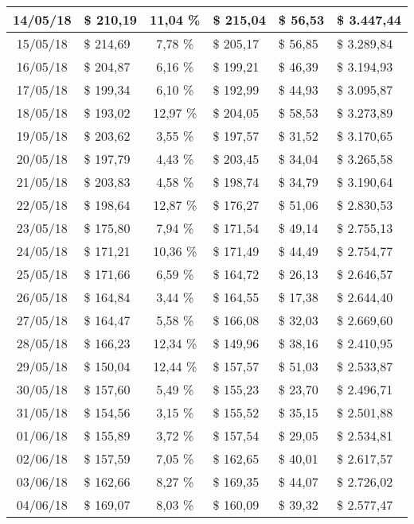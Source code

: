 \begin{center}
\begin{small}
\begin{longtable}{|c|l|c|l|l|l|}
14/05/18 & \$ 210,19 & 11,04 \% & \$ 215,04 & \$ 56,53 & \$ 3.447,44 \\ \hline
15/05/18 & \$ 214,69 & 7,78 \% & \$ 205,17 & \$ 56,85 & \$ 3.289,84 \\ \hline
16/05/18 & \$ 204,87 & 6,16 \% & \$ 199,21 & \$ 46,39 & \$ 3.194,93 \\ \hline
17/05/18 & \$ 199,34 & 6,10 \% & \$ 192,99 & \$ 44,93 & \$ 3.095,87 \\ \hline
18/05/18 & \$ 193,02 & 12,97 \% & \$ 204,05 & \$ 58,53 & \$ 3.273,89 \\ \hline
19/05/18 & \$ 203,62 & 3,55 \% & \$ 197,57 & \$ 31,52 & \$ 3.170,65 \\ \hline
20/05/18 & \$ 197,79 & 4,43 \% & \$ 203,45 & \$ 34,04 & \$ 3.265,58 \\ \hline
21/05/18 & \$ 203,83 & 4,58 \% & \$ 198,74 & \$ 34,79 & \$ 3.190,64 \\ \hline
22/05/18 & \$ 198,64 & 12,87 \% & \$ 176,27 & \$ 51,06 & \$ 2.830,53 \\ \hline
23/05/18 & \$ 175,80 & 7,94 \% & \$ 171,54 & \$ 49,14 & \$ 2.755,13 \\ \hline
24/05/18 & \$ 171,21 & 10,36 \% & \$ 171,49 & \$ 44,49 & \$ 2.754,77 \\ \hline
25/05/18 & \$ 171,66 & 6,59 \% & \$ 164,72 & \$ 26,13 & \$ 2.646,57 \\ \hline
26/05/18 & \$ 164,84 & 3,44 \% & \$ 164,55 & \$ 17,38 & \$ 2.644,40 \\ \hline
27/05/18 & \$ 164,47 & 5,58 \% & \$ 166,08 & \$ 32,03 & \$ 2.669,60 \\ \hline
28/05/18 & \$ 166,23 & 12,34 \% & \$ 149,96 & \$ 38,16 & \$ 2.410,95 \\ \hline
29/05/18 & \$ 150,04 & 12,44 \% & \$ 157,57 & \$ 51,03 & \$ 2.533,87 \\ \hline
30/05/18 & \$ 157,60 & 5,49 \% & \$ 155,23 & \$ 23,70 & \$ 2.496,71 \\ \hline
31/05/18 & \$ 154,56 & 3,15 \% & \$ 155,52 & \$ 35,15 & \$ 2.501,88 \\ \hline
01/06/18 & \$ 155,89 & 3,72 \% & \$ 157,54 & \$ 29,05 & \$ 2.534,81 \\ \hline
02/06/18 & \$ 157,59 & 7,05 \% & \$ 162,65 & \$ 40,01 & \$ 2.617,57 \\ \hline
03/06/18 & \$ 162,66 & 8,27 \% & \$ 169,35 & \$ 44,07 & \$ 2.726,02 \\ \hline
04/06/18 & \$ 169,07 & 8,03 \% & \$ 160,09 & \$ 39,32 & \$ 2.577,47 \\ \hline

\end{longtable}
\end{small}
\end{center}
